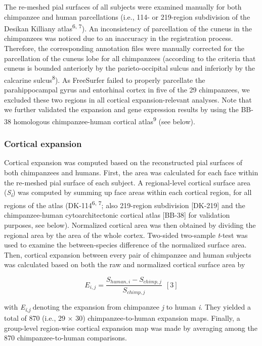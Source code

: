 \begin{refsection}
The re-meshed pial surfaces of all subjects were examined manually for both chimpanzee and human parcellations (i.e., 114- or 219-region subdivision of the Desikan Killiany atlas\textsuperscript{6, 7}). An inconsistency of parcellation of the cuneus in the chimpanzees was noticed due to an inaccuracy in the registration process. Therefore, the corresponding annotation files were manually corrected for the parcellation of the cuneus lobe for all chimpanzees (according to the criteria that cuneus is bounded anteriorly by the parieto-occipital sulcus and inferiorly by the calcarine sulcus\textsuperscript{8}). As FreeSurfer failed to properly parcellate the parahippocampal gyrus and entorhinal cortex in five of the 29 chimpanzees, we excluded these two regions in all cortical expansion-relevant analyses. Note that we further validated the expansion and gene expression results by using the BB-38 homologous chimpanzee-human cortical atlas\textsuperscript{9} (see below).

\subsubsection*{Cortical expansion}
Cortical expansion was computed based on the reconstructed pial surfaces of both chimpanzees and humans. First, the area was calculated for each face within the re-meshed pial surface of each subject. A regional-level cortical surface area (\textit{S\textsubscript{i}}) was computed by summing up face areas within each cortical region, for all regions of the atlas (DK-114\textsuperscript{6, 7}; also 219-region subdivision [DK-219] and the chimpanzee-human cytoarchitectonic cortical atlas [BB-38] for validation purposes, see below). Normalized cortical area was then obtained by dividing the regional area by the area of the whole cortex. Two-sided two-sample \textit{t}-test was used to examine the between-species difference of the normalized surface area. Then, cortical expansion between every pair of chimpanzee and human subjects was calculated based on both the raw and normalized cortical surface area by

\[ E_{i,j}=\frac{S_{human,i}-S_{chimp,j}}{S_{chimp,j}} \ \ [3] \]

with \textit{E\textsubscript{i,j} }denoting the expansion from chimpanzee \textit{j} to human \textit{i}. They yielded a total of 870 (i.e., 29 $ \times $  30) chimpanzee-to-human expansion maps. Finally, a group-level region-wise cortical expansion map was made by averaging among the 870 chimpanzee-to-human comparisons.


\end{refsection}
